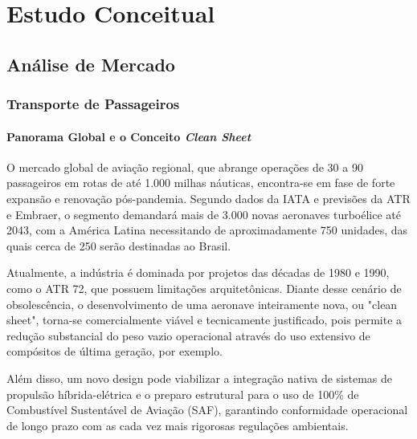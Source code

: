\chapter{Estudo Conceitual}

\section{Análise de Mercado}

\subsection{Transporte de Passageiros}

\subsubsection{Panorama Global e o Conceito \textit{Clean Sheet}}

O mercado global de aviação regional, que abrange operações de 30 a 90 passageiros em rotas de até 1.000 milhas náuticas, encontra-se em fase de forte expansão e renovação pós-pandemia. Segundo dados da IATA e previsões da ATR e Embraer, o segmento demandará mais de 3.000 novas aeronaves turboélice até 2043, com a América Latina necessitando de aproximadamente 750 unidades, das quais cerca de 250 serão destinadas ao Brasil. 



Atualmente, a indústria é dominada por projetos das décadas de 1980 e 1990, como o ATR 72, que possuem limitações arquitetônicas. Diante desse cenário de obsolescência, o desenvolvimento de uma aeronave inteiramente nova, ou "clean sheet", torna-se comercialmente viável e tecnicamente justificado, pois permite a redução substancial do peso vazio operacional através do uso extensivo de compósitos de última geração, por exemplo.

Além disso, um novo design pode viabilizar a integração nativa de sistemas de propulsão híbrida-elétrica e o preparo estrutural para o uso de 100\% de Combustível Sustentável de Aviação (SAF), garantindo conformidade operacional de longo prazo com as cada vez mais rigorosas regulações ambientais.

